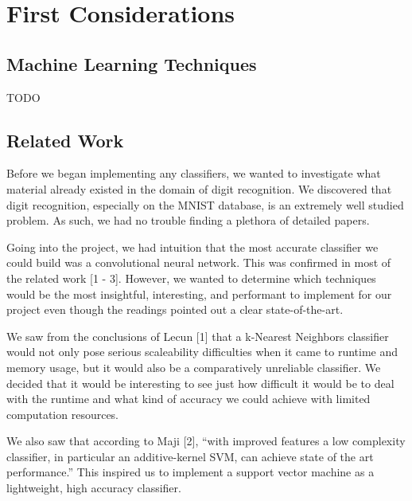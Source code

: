 ﻿\documentclass{article} %
\begin{document}
\section{First Considerations}
\subsection{Machine Learning Techniques}
TODO

\subsection{Related Work}
Before we began implementing any classifiers, we wanted to investigate what
material already existed in the domain of digit recognition. We discovered
that digit recognition, especially on the MNIST database, is an extremely well
studied problem. As such, we had no trouble finding a plethora of detailed
papers.

Going into the project, we had intuition that the most accurate classifier we
could build was a convolutional neural network. This was confirmed in most of
the related work [1 - 3].
However, we wanted to determine which techniques would be the most insightful,
interesting, and performant to implement for our project even though the
readings pointed out a clear state-of-the-art.

We saw from the
conclusions of Lecun [1] that a k-Nearest Neighbors classifier would not
only pose serious scaleability difficulties when it came to runtime and memory
usage, but it would also be a comparatively unreliable classifier. We decided
that it would be interesting to see just how difficult it would be to deal with
the runtime and what kind of accuracy we could achieve with limited
computation resources.

We also saw that according to Maji [2], ``with improved features a low
complexity classifier, in particular
an additive-kernel SVM, can achieve state of the art performance.'' This
inspired us to implement a support vector machine as a lightweight, high
accuracy classifier.

\end{document}
